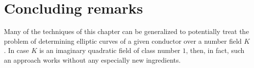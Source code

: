 

\section{Concluding remarks}

Many of the techniques of this chapter can be generalized to potentially treat the problem of determining elliptic curves of a given conductor over a number field $K$. 
In case $K$ is an imaginary quadratic field of class number $1$, then, in fact, such an approach works without any especially new ingredients. 




\endinput

Any text after an \endinput is ignored.
You could put scraps here or things in progress.
